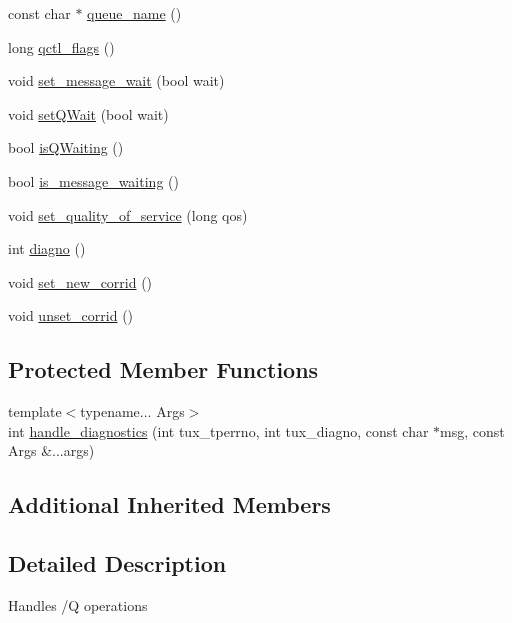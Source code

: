 \begin{DoxyCompactItemize}
\item 
const char $\ast$ \hyperlink{classatmi_1_1queue_adaddc33c75ec6e13f6c57da8d979ad32}{queue\+\_\+name} ()
\item 
long \hyperlink{classatmi_1_1queue_a96f51996c857985c9b8e1b720f726f0c}{qctl\+\_\+flags} ()
\item 
void \hyperlink{classatmi_1_1queue_a9669776889226a450093d2ddfd921d4b}{set\+\_\+message\+\_\+wait} (bool wait)
\item 
void \hyperlink{classatmi_1_1queue_a223fac7945fb8d87f04189aa77ce666a}{set\+Q\+Wait} (bool wait)
\item 
bool \hyperlink{classatmi_1_1queue_a90f5a71979755634b1e625d45ac61412}{is\+Q\+Waiting} ()
\item 
bool \hyperlink{classatmi_1_1queue_ac655db1db167f3e833f4fa84e6256428}{is\+\_\+message\+\_\+waiting} ()
\item 
void \hyperlink{classatmi_1_1queue_a0fbca137aadc2946b8f3889b76352af9}{set\+\_\+quality\+\_\+of\+\_\+service} (long qos)
\item 
int \hyperlink{classatmi_1_1queue_a1fabff1d9a56389a41f92542561d570d}{diagno} ()
\item 
void \hyperlink{classatmi_1_1queue_a2c0511c9f17e939789c5290fe83d1f1f}{set\+\_\+new\+\_\+corrid} ()
\item 
void \hyperlink{classatmi_1_1queue_aa74de8091c32580972e7871e7ddf786c}{unset\+\_\+corrid} ()
\end{DoxyCompactItemize}
\subsection*{Protected Member Functions}
\begin{DoxyCompactItemize}
\item 
{\footnotesize template$<$typename... Args$>$ }\\int \hyperlink{classatmi_1_1queue_a767f80e22a52d4b325d5a5aadc27a343}{handle\+\_\+diagnostics} (int tux\+\_\+tperrno, int tux\+\_\+diagno, const char $\ast$msg, const Args \&...args)
\end{DoxyCompactItemize}
\subsection*{Additional Inherited Members}


\subsection{Detailed Description}
Handles /\+Q operations 

